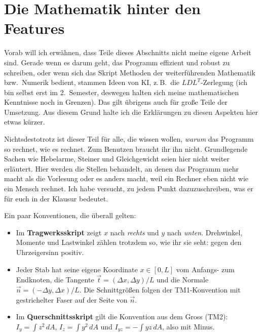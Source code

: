 
\part{Die Mathematik hinter den Features}\label{sec:Mathe}

Vorab will ich erwähnen, dass Teile dieses Abschnitts nicht meine eigene Arbeit sind. Gerade wenn
es darum geht, das Programm effizient und robust zu schreiben, oder wenn sich das Skript Methoden der
weiterführenden Mathematik bzw.\ Numerik bedient, stammen Ideen von KI, z.\,B.\ die
$LDL^T$-Zerlegung (ich bin selbst erst im 2.~Semester, deswegen halten sich meine mathematischen
Kenntnisse noch in Grenzen). Das gilt übrigens auch für große Teile der Umsetzung. Aus diesem Grund
halte ich die Erklärungen zu diesen Aspekten hier etwas kürzer.

Nichtsdestotrotz ist dieser Teil für alle, die wissen wollen, \emph{warum} das Programm so rechnet, wie es rechnet.
Zum Benutzen braucht ihr ihn nicht. Grundlegende Sachen wie Hebelarme, Steiner und Gleichgewicht seien hier nicht weiter erläutert. Hier
werden die Stellen behandelt, an denen das Programm mehr macht als die Vorlesung oder es anders macht,
weil ein Rechner eben nicht wie ein Mensch rechnet. Ich habe versucht, zu jedem Punkt dazuzuschreiben,
was er für euch in der Klausur bedeutet.

Ein paar Konventionen, die überall gelten:

\begin{itemize}
  \item Im \textbf{Tragwerksskript} zeigt $x$ nach \emph{rechts} und $y$ nach \emph{unten}. Drehwinkel,
        Momente und Lastwinkel zählen trotzdem so, wie ihr sie seht: gegen den Uhrzeigersinn
        positiv.
  \item Jeder Stab hat seine eigene Koordinate $x \in [0, L]$ vom Anfangs- zum Endknoten, die
        Tangente $\vec t = (\Delta x, \Delta y)/L$ und die Normale $\vec n = (-\Delta y, \Delta x)/L$.
        Die Schnittgrößen folgen der TM1-Konvention mit gestrichelter Faser auf der Seite von
        $\vec n$.
  \item Im \textbf{Querschnittsskript} gilt die Konvention aus dem Gross (TM2):
        $I_y = \int z^2\,dA$, $I_z = \int y^2\,dA$ und $I_{yz} = -\int yz\,dA$, also mit Minus.
\end{itemize}

